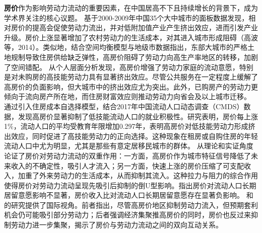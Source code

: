 \documentclass[a4paper,12pt,oneside, fontset=mac]{ctexbook} %
\begin{document}
\textbf{房价}作为影响劳动力流动的重要因素，在中国居高不下且持续增长的背景下，成为学术界关注的核心议题。
\cite{GaoBoQuYuFangJieChaiYiLaoDongLiLiuDongYuChanYeShengJi2012}基于2000-2009年中国35个大中城市的面板数据发现，相对房价的提高会促使劳动力流出，并对低附加值产业产生挤出效应，进而引发产业升级。房价上涨显著增加了农村劳动力的生活成本，对其进入城市形成阻碍（高波等，2014）。类似地，\cite{WangLiLiTuDiGongGeiFangJieYuLaoDongLiKongJianPeiZhiXiaoLu2023}结合空间均衡模型与地级市数据指出，东部大城市的严格土地规制导致住房供给缺乏弹性，高房价阻碍了劳动力向高生产率地区的转移，加剧了空间错配。
\cite{ZhouYingGangGaoFangJieJiChuLiaoShuiJiYuZhongGuoLiuDongRenKouDeWeiGuanShiJiao2019}从个人层面分析发现，高房价增强了劳动力家庭的流动意愿，特别是对未购房的高技能劳动力具有显著挤出效应。尽管公共服务在一定程度上缓解了高房价的负面影响，但大城市中的挤出效应尤为突出。此外，已购房产的劳动力更倾向于流向房产所在地，而住房财富效应则推动劳动力向省会及以上城市迁移。
\cite{zhouHousingPricesMigration2022}通过引入住房成本自选择模型，结合2017年中国流动人口动态调查（CMDS）数据，发现高房价显著抑制了低技能流动人口的就业积极性。研究表明，房价每上涨1\%，流动人口的平均受教育年限增加0.297年，表明高房价对低技能劳动力形成挤出效应，同时促进了高技能劳动力的正向选择。这种现象在租房或自购住房的年轻流动人口中尤为明显，尤其是那些有意定居移民城市的群体。
\cite{ZhangLiFangJieRuHeYingXiangLaoDongLiLiuDong2017}从理论和实证角度论证了房价对劳动力流动的双重作用：一方面，高房价作为城市特征信号降低了未来收入的不确定性，吸引人才流入；另一方面，快速上涨的房价压缩了可支配收入，加重了外来劳动力的生活成本，从而抑制其流入。这种拉力与阻力的综合作用使得房价对劳动力流动呈现先吸引后抑制的倒U型影响。\cite{LiHuiFangJieFangJieShouRuBiYuLiuDongRenKouChangQiJuLiuYiYuanLaiZiLiuDongRenKouDeWeiGuanZhengJu2019}指出房价对流动人口长期居留意愿影响不显著，房价收入比对流动人口长期居留意愿存在显著负影响。
\cite{ballHousingSupplyPrice2010}和\cite{helpmanSizeRegions1998}的研究提供了国际视角。前者指出，尽管高房价地区抑制劳动力流入，但预期套利机会仍可能吸引部分劳动力；后者强调经济集聚推高房价的同时，房价也反过来抑制劳动力进一步集聚，揭示了房价与劳动力流动之间的双向互动关系。
\end{document}
